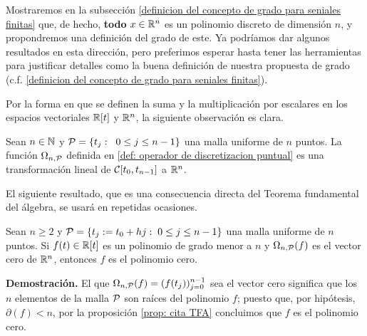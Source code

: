 

Mostraremos en la subsección
\ref{definicion del concepto de grado para seniales finitas}
que, de hecho, \textbf{todo}
$x \in \mathbb{R}^{n}$ es un polinomio discreto
de dimensión $n$,
y propondremos una definición del grado de este.
Ya podríamos dar algunos resultados en esta dirección,
pero preferimos esperar hasta tener las herramientas
para justificar detalles como la buena definición
de nuestra propuesta de grado (c.f. 
\ref{definicion del concepto de grado para seniales finitas}).


Por la forma en que se definen la suma y la multiplicación
por escalares en los espacios vectoriales $\mathbb{R}[t]$
y $\mathbb{R}^{n}$, la siguiente observación es clara.

\begin{obs} \label{obs:linealidad de omega restringida a R[x]}
Sean $n \in \mathbb{N}$ y $\mathcal{P}=\{t_{j}:
\hspace{0.2cm}0 \leq j \leq n-1 \}$ una malla uniforme
de $n$ puntos.
La función $\Omega_{n , \mathcal{P}}$ 
definida en 
\ref{def: operador de discretizacion puntual}
es una transformación lineal de 
$\mathcal{C}[t_{0}, t_{n-1}]$ a $\mathbb{R}^{n}$.
\end{obs}
 
El siguiente resultado, que es una consecuencia directa
del Teorema fundamental del álgebra, se usará en repetidas ocasiones.

\begin{prop}
\label{prop: consecuencia del TFA}
Sean $n \geq 2$ y 
$\mathcal{P}=\{ t_{j}:=t_{0}+hj : \hspace{0.1cm} 0 \leq j \leq n-1 \}$ 
una malla uniforme de $n$ puntos.
Si $f(t) \in \mathbb{R}[t]$ es un polinomio de grado menor a $n$ y
$\Omega_{n, \mathcal{P}}(f)$ es el vector cero de $\mathbb{R}^{n}$, entonces
$f$ es el polinomio cero.
\end{prop}
\noindent
\textbf{Demostración.}
El que $\Omega_{n, \mathcal{P}}(f)=(f(t_{j}))_{j=0}^{n-1}$ sea
el vector cero significa que los $n$ elementos de la malla
$\mathcal{P}$ son raíces del polinomio $f$; puesto que, por hipótesis,
$\partial(f) < n$, por la proposición
\ref{prop: cita TFA}
concluimos que
$f$ es el polinomio cero.
\QEDB
\vspace{0.2cm}




